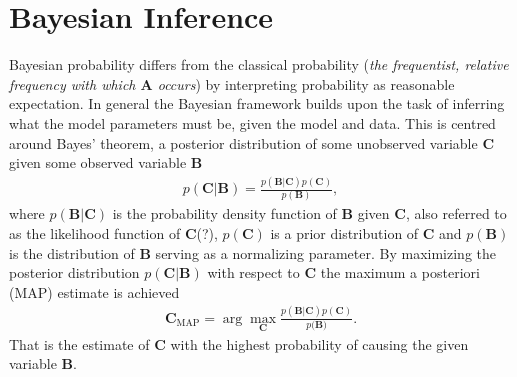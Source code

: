 \section{Bayesian Inference}
Bayesian probability differs from the classical probability (\textit{the frequentist, relative frequency with which $\mathbf{A}$ occurs}) by interpreting probability as reasonable expectation. 
In general the Bayesian framework builds upon the task of inferring what the model parameters must be, given the model and data.  
This is centred around Bayes' theorem, a posterior distribution of some unobserved variable $\mathbf{C}$ given some observed variable $\mathbf{B}$
\begin{align*}
p(\mathbf{C}|\mathbf{B}) = \frac{p(\mathbf{B}|\mathbf{C}) p(\mathbf{C})}{p(\mathbf{B})},
\end{align*}  
where $p(\mathbf{B}|\mathbf{C})$ is the probability density function of $\mathbf{B}$ given $\mathbf{C}$, also referred to as the likelihood function of $\mathbf{C}$(?), $p(\mathbf{C})$ is a prior distribution of $\mathbf{C}$ and $p(\mathbf{B})$ is the distribution of $\mathbf{B}$ serving as a normalizing parameter.  
By maximizing the posterior distribution $p(\mathbf{C}|\mathbf{B})$ with respect to $\mathbf{C}$ the maximum a posteriori (MAP) estimate is achieved
\begin{align*}
\mathbf{C}_{\text{MAP}} = \arg \max_{\mathbf{C}} \frac{p(\mathbf{B} \vert \mathbf{C}) p(\mathbf{C})}{p(\mathbf{B)}}.
\end{align*}
That is the estimate of $\mathbf{C}$ with the highest probability of causing the given variable $\mathbf{B}$.

